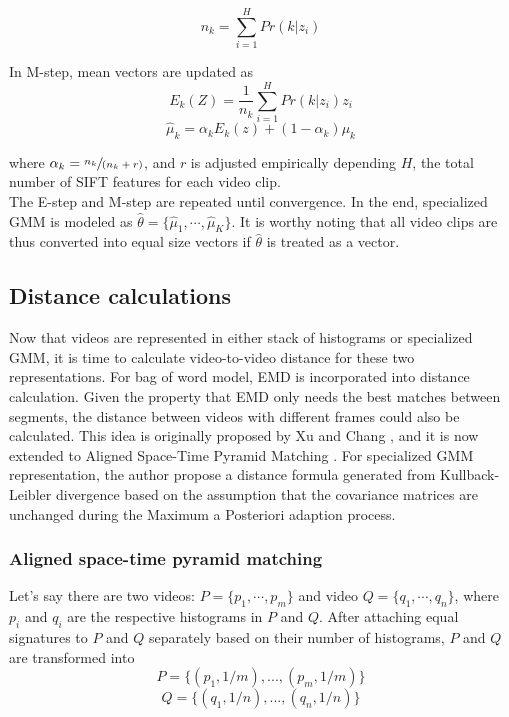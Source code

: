 	\begin{equation}
	n_k = \sum_{i=1}^{H}Pr(k|z_i)
	\end{equation}

	\noindent In M-step, mean vectors are updated as
	\begin{equation}
	E_k(Z) = \frac{1}{n_k} \sum_{i=1}^{H} Pr(k|z_i) z_i
	\end{equation}
	\begin{equation}
	\hat\mu_k = \alpha_k E_k(z) + (1 - \alpha_k) \mu_k
	\end{equation}

	\noindent where $\alpha_k = \sfrac{n_k}{(n_k + r)}$, and $r$ is adjusted empirically depending $H$, the total number of SIFT features for each video clip.\\

	\noindent The E-step and M-step are repeated until convergence. In the end, specialized GMM is modeled as $\hat\theta = \{\hat\mu_1, \cdots, \hat\mu_K \}$. It is worthy noting that all video clips are thus converted into equal size vectors if $\hat\theta$ is treated as a vector.

\subsection{Distance calculations}
	Now that videos are represented in either stack of histograms or specialized GMM, it is time to calculate video-to-video distance for these two representations. For bag of word model, EMD is incorporated into distance calculation. Given the property that EMD only needs the best matches between segments, the distance between videos with different frames could also be calculated. This idea is originally proposed by Xu and Chang \cite{xu2007visual}, and it is now extended to Aligned Space-Time Pyramid Matching \cite{duan2012visual}. For specialized GMM representation, the author \cite{zhou2008sift} propose a distance formula generated from Kullback-Leibler divergence based on the assumption that the covariance matrices are unchanged during the Maximum a Posteriori adaption process.
	
	\subsubsection{Aligned space-time pyramid matching}
	Let's say there are two videos: $P = \{p_1, \cdots, p_m\}$ and video $Q = \{q_1, \cdots, q_n\}$, where $p_i$ and $q_i$ are the respective histograms in $P$ and $Q$. After attaching equal signatures to $P$ and $Q$ separately based on their number of histograms, $P$ and $Q$ are transformed into
	$$P = \{(p_1, 1 / m),...,(p_m, 1 / m) \}$$
	$$Q = \{(q_1, 1 / n),...,(q_n, 1 / n) \}$$
	
